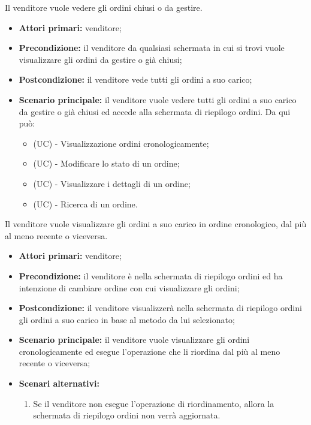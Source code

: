 Il venditore vuole vedere gli ordini chiusi o da gestire.
\begin{itemize}
    \item \textbf{Attori primari:} venditore;
    \item \textbf{Precondizione:} il venditore da qualsiasi schermata in cui si trovi vuole visualizzare gli ordini da gestire o già chiusi;
    \item \textbf{Postcondizione:} il venditore vede tutti gli ordini a suo carico;
    \item \textbf{Scenario principale:} il venditore vuole vedere tutti gli ordini a suo carico da gestire o già chiusi ed accede alla schermata di riepilogo ordini. Da qui può:
    \begin{itemize}
    	\item (UC) - Visualizzazione ordini cronologicamente;
        \item (UC) - Modificare lo stato di un ordine;
        \item (UC) - Visualizzare i dettagli di un ordine;
        \item (UC) - Ricerca di un ordine.
    \end{itemize}
\end{itemize}

\resetSubUC
{}
Il venditore vuole visualizzare gli ordini a suo carico in ordine cronologico, dal più al meno recente o viceversa.
\begin{itemize}
	\item \textbf{Attori primari:} venditore;
	\item \textbf{Precondizione:} il venditore è nella schermata di riepilogo ordini ed ha intenzione di cambiare ordine con cui visualizzare gli ordini;
	\item \textbf{Postcondizione:} il venditore visualizzerà nella schermata di riepilogo ordini gli ordini a suo carico in base al metodo da lui selezionato;
	\item \textbf{Scenario principale:} il venditore vuole visualizzare gli ordini cronologicamente ed esegue l'operazione che li riordina dal più al meno recente o viceversa;
	\item \textbf{Scenari alternativi:}
	\begin{enumerate}[label=\lett]
		\item Se il venditore non esegue l'operazione di riordinamento, allora la schermata di riepilogo ordini non verrà aggiornata.
	\end{enumerate}
\end{itemize}

